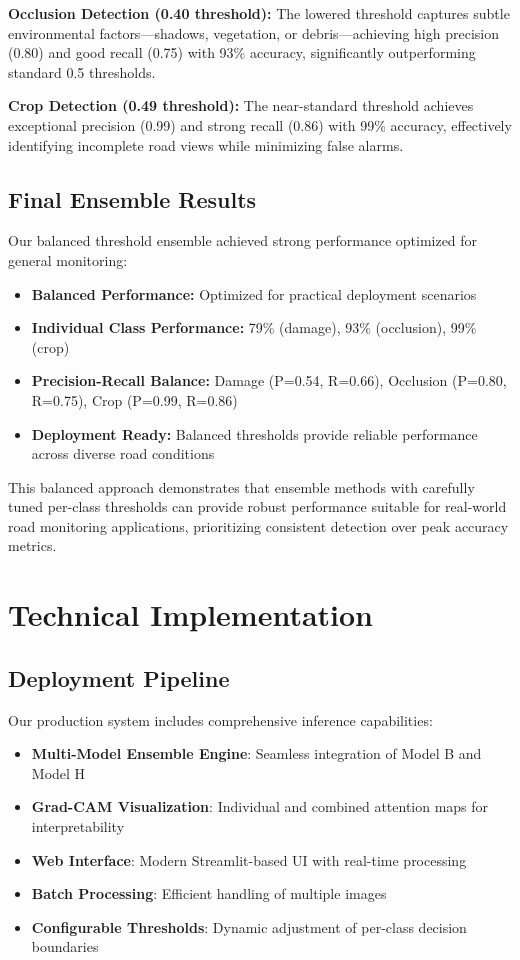 \documentclass[12pt,twocolumn]{article}
\begin{document}
\textbf{Occlusion Detection (0.40 threshold):} The lowered threshold captures subtle environmental factors—shadows, vegetation, or debris—achieving high precision (0.80) and good recall (0.75) with 93\% accuracy, significantly outperforming standard 0.5 thresholds.

\textbf{Crop Detection (0.49 threshold):} The near-standard threshold achieves exceptional precision (0.99) and strong recall (0.86) with 99\% accuracy, effectively identifying incomplete road views while minimizing false alarms.

\subsection{Final Ensemble Results}

Our balanced threshold ensemble achieved strong performance optimized for general monitoring:

\begin{itemize}[itemsep=1pt,parsep=0pt,topsep=3pt]
\item \textbf{Balanced Performance:} Optimized for practical deployment scenarios
\item \textbf{Individual Class Performance:} 79\% (damage), 93\% (occlusion), 99\% (crop)
\item \textbf{Precision-Recall Balance:} Damage (P=0.54, R=0.66), Occlusion (P=0.80, R=0.75), Crop (P=0.99, R=0.86)
\item \textbf{Deployment Ready:} Balanced thresholds provide reliable performance across diverse road conditions
\end{itemize}

This balanced approach demonstrates that ensemble methods with carefully tuned per-class thresholds can provide robust performance suitable for real-world road monitoring applications, prioritizing consistent detection over peak accuracy metrics.

\section{Technical Implementation}

\subsection{Deployment Pipeline}

Our production system includes comprehensive inference capabilities:

\begin{itemize}[itemsep=1pt,parsep=0pt,topsep=3pt]
\item \textbf{Multi-Model Ensemble Engine}: Seamless integration of Model B and Model H
\item \textbf{Grad-CAM Visualization}: Individual and combined attention maps for interpretability
\item \textbf{Web Interface}: Modern Streamlit-based UI with real-time processing
\item \textbf{Batch Processing}: Efficient handling of multiple images
\item \textbf{Configurable Thresholds}: Dynamic adjustment of per-class decision boundaries
\end{itemize}
\end{document}
